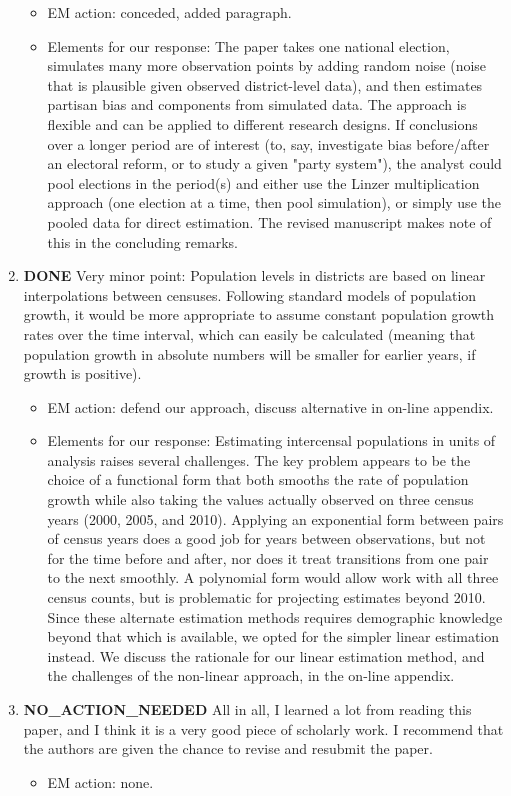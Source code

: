 \documentclass{article}
\begin{document}
\begin{enumerate}
\label{sec:orgheadline12}
\begin{itemize}
\item EM action: conceded, added paragraph.
\item Elements for our response: The paper takes one national election, simulates many more observation points by adding random noise (noise that is plausible given observed district-level data), and then estimates partisan bias and components from simulated data. The approach is flexible and can be applied to different research designs. If conclusions over a longer period are of interest (to, say, investigate bias before/after an electoral reform, or to study a given "party system"), the analyst could pool elections in the period(s) and either use the Linzer multiplication approach (one election at a time, then pool simulation), or simply use the pooled data for direct estimation. The revised manuscript makes note of this in the concluding remarks.
\end{itemize}
\item {\bfseries\sffamily DONE} Very minor point: Population levels in districts are based on linear interpolations between censuses. Following standard models of population growth, it would be more appropriate to assume constant population growth rates over the time interval, which can easily be calculated (meaning that population growth in absolute numbers will be smaller for earlier years, if growth is positive).
\label{sec:orgheadline13}
\begin{itemize}
\item EM action: defend our approach, discuss alternative in on-line appendix.
\item Elements for our response: Estimating intercensal populations in units of analysis raises several challenges. The key problem appears to be the choice of a functional form that both smooths the rate of population growth while also taking the values actually observed on three census years (2000, 2005, and 2010). Applying an exponential form between pairs of census years does a good job for years between observations, but not for the time before and after, nor does it treat transitions from one pair to the next smoothly. A polynomial form would allow work with all three census counts, but is problematic for projecting estimates beyond 2010. Since these alternate estimation methods requires demographic knowledge beyond that which is available, we opted for the simpler linear estimation instead. We discuss the rationale for our linear estimation method, and the challenges of the non-linear approach, in the on-line appendix.
\end{itemize}
\item {\bfseries\sffamily NO\_ACTION\_NEEDED} All in all, I learned a lot from reading this paper, and I think it is a very good piece of scholarly work. I recommend that the authors are given the chance to revise and resubmit the paper.
\label{sec:orgheadline14}
\begin{itemize}
\item EM action: none.
\end{itemize}
\end{enumerate}
\end{document}

